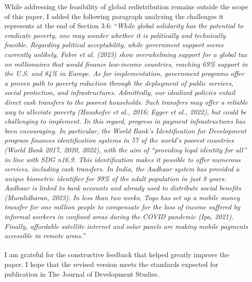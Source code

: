 \documentclass[12pt,english]{article}
\begin{document}
While addressing the feasibility of global redistribution remains outside the scope of this paper, I added the following paragraph analyzing the challenges it represents at the end of Section 3.6: 
``\textit{While global solidarity has the potential to eradicate poverty, one may wonder whether it is politically and technically feasible. 
Regarding political acceptability, while government support seems currently unlikely, Fabre et al. (2023) show overwhelming support for a global tax on millionaires that would finance low-income countries, reaching 69\% support in the U.S. and 84\% in Europe. %
As for implementation, government programs offer a proven path to poverty reduction through the deployment of public services, social protection, and infrastructures. 
Admittedly, our idealized policies entail direct cash transfers to the poorest households. Such transfers may offer a reliable way to alleviate poverty (Haushofer et al., 2016; Egger et al., 2022), but could be challenging to implement. In this regard, progress in payment infrastructures has been encouraging. In particular, the World Bank's \textit{Identification for Development} program finances identification systems in 57 of the world's poorest countries (World Bank 2017, 2020, 2022), with the aim of ``providing legal identity for all'' in line with SDG n\textdegree{}16.9. This identification makes it possible to offer numerous services, including cash transfers. In India, the Aadhaar system has provided a unique biometric identifier for 99\% of the adult population in just 8 years. Aadhaar is linked to bank accounts and already used to distribute social benefits (Muralidharan, 2023). In less than two weeks, Togo has set up a mobile money transfer for one million people to compensate for the loss of income suffered by informal workers in confined areas during the COVID pandemic (Ipa, 2021). Finally, affordable satellite internet and solar panels are making mobile payments accessible in remote areas.}''
~\\ ~\\

I am grateful for the constructive feedback that helped greatly improve the paper. I hope that the revised version meets the standards expected for publication in The Journal of Development Studies.

\clearpage 
\renewcommand{\url}[1]{\href{#1}{Link}} 
%  
% 
\end{document}
